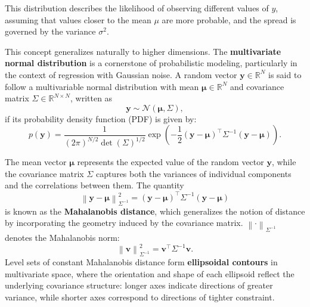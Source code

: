 \documentclass[12pt]{article}
\begin{document}
This distribution describes the likelihood of observing different values of \( y \), assuming that values closer to the mean \( \mu \) are more probable, and the spread is governed by the variance \( \sigma^2 \).

This concept generalizes naturally to higher dimensions. The \textbf{multivariate normal distribution} is a cornerstone of probabilistic modeling, particularly in the context of regression with Gaussian noise. A random vector \( \mathbf{y} \in \mathbb{R}^N \) is said to follow a multivariable normal distribution with mean \( \boldsymbol{\mu} \in \mathbb{R}^N \) and covariance matrix \( \Sigma \in \mathbb{R}^{N \times N} \), written as
\begin{equation}
    \mathbf{y} \sim \mathcal{N}(\boldsymbol{\mu}, \Sigma),
\end{equation}
if its probability density function (PDF) is given by:
\begin{equation}
    p(\mathbf{y}) = \frac{1}{(2\pi)^{N/2} \det(\Sigma)^{1/2}} \exp\left( -\frac{1}{2} (\mathbf{y} - \boldsymbol{\mu})^\top \Sigma^{-1} (\mathbf{y} - \boldsymbol{\mu}) \right).
\end{equation}

The mean vector \( \boldsymbol{\mu} \) represents the expected value of the random vector \( \mathbf{y} \), while the covariance matrix \( \Sigma \) captures both the variances of individual components and the correlations between them. The quantity
\begin{equation}
\left\lVert \mathbf{y} - \boldsymbol{\mu} \right\rVert_{\Sigma^{-1}}^2 = (\mathbf{y} - \boldsymbol{\mu})^\top \Sigma^{-1} (\mathbf{y} - \boldsymbol{\mu})
\end{equation}
is known as the \textbf{Mahalanobis distance}, which generalizes the notion of distance by incorporating the geometry induced by the covariance matrix. \( \left\lVert \cdot \right\rVert_{\Sigma^{-1}} \) denotes the Mahalanobis norm:
\begin{equation}
\left\lVert \mathbf{v} \right\rVert_{\Sigma^{-1}}^2 = \mathbf{v}^\top \Sigma^{-1} \mathbf{v}.
\end{equation} 
Level sets of constant Mahalanobis distance form \textbf{ellipsoidal contours} in multivariate space, where the orientation and shape of each ellipsoid reflect the underlying covariance structure: longer axes indicate directions of greater variance, while shorter axes correspond to directions of tighter constraint. 
\end{document}
